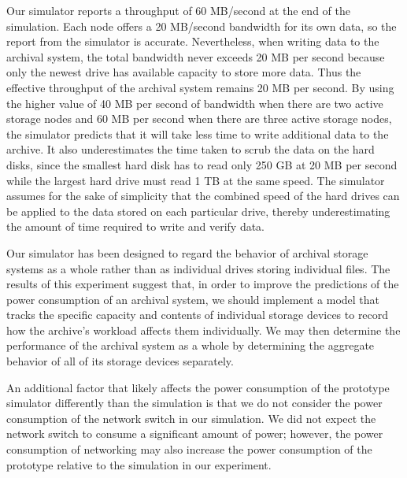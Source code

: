 Our simulator reports a throughput of 60 MB/second at the end of the simulation.  Each node offers a 20 MB/second bandwidth for its own data, so the report from the simulator is accurate.  Nevertheless, when writing data to the archival system, the total bandwidth never exceeds 20 MB per second because only the newest drive has available capacity to store more data.  Thus the effective throughput of the archival system remains 20 MB per second.  By using the higher value of 40 MB per second of bandwidth when there are two active storage nodes and 60 MB per second when there are three active storage nodes, the simulator predicts that it will take less time to write additional data to the archive.  It also underestimates the time taken to scrub the data on the hard disks, since the smallest hard disk has to read only 250 GB at 20 MB per second while the largest hard drive must read 1 TB at the same speed.  The simulator assumes for the sake of simplicity that the combined speed of the hard drives can be applied to the data stored on each particular drive, thereby underestimating the amount of time required to  write and verify data.

Our simulator has been designed to regard the behavior of archival storage systems as a whole rather than as individual drives storing individual files.  The results of this experiment suggest that, in order to improve the predictions of the power consumption of an archival system, we should implement a model that tracks the specific capacity and contents of individual storage devices to record how the archive's workload affects them individually.  We may then determine the performance of the archival system as a whole by determining the aggregate behavior of all of its storage devices separately.

An additional factor that likely affects the power consumption of the prototype simulator differently than the simulation is that we do not consider the power consumption of the network switch in our simulation.  We did not expect the network switch to consume a significant amount of power; however, the power consumption of networking may also increase the power consumption of the prototype relative to the simulation in our experiment.

